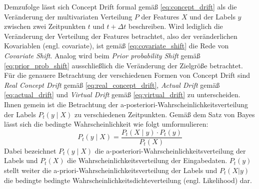 %
Demzufolge lässt sich Concept Drift formal gemäß \eqref{eq:concept_drift} als die Veränderung der multivariaten Verteilung $P$ der Features $X$ und der Labels $y$ zwischen zwei Zeitpunkten $t$ und $t + \Delta t$ beschreiben. 
Wird lediglich die Veränderung der Verteilung der Features betrachtet, also der veränderlichen Kovariablen (engl. covariate), ist gemäß \eqref{eq:covariate_shift} die Rede von \emph{Covariate Shift}. Analog wird beim \emph{Prior probability Shift} gemäß \eqref{eq:prior_prob_shift} ausschließlich die Veränderung der Zielgröße betrachtet. 
Für die genauere Betrachtung der verschiedenen Formen von Concept Drift sind \emph{Real Concept Drift} gemäß \eqref{eq:real_concept_drift}, \emph{Actual Drift} gemäß \eqref{eq:actual_drift} und \emph{Virtual Drift} gemäß \eqref{eq:virtual_drift} zu unterscheiden. Ihnen gemein ist die Betrachtung der a-posteriori-Wahrscheinlichkeitsverteilung der Labels $P_t(y \mid X)$ zu verschiedenen Zeitpunkten. Gemäß dem Satz von Bayes lässt sich die bedingte Wahrscheinlichkeit wie folgt umformulieren:
%
\begin{equation} \label{eq:bayes}
    P_t(y \mid X) = \frac{P_t(X \mid y) \cdot P_t(y)}{P_t(X)}
\end{equation}
%
Dabei bezeichnet $P_t(y \mid X)$ die a-posteriori-Wahrscheinlichkeitsverteilung der Labels und $P_t(X)$ die Wahrscheinlichkeitsverteilung der Eingabedaten. $P_t(y)$ stellt weiter die a-priori-Wahrscheinlichkeitsverteilung der Labels und $P_t(X | y)$ die bedingte bedingte Wahrscheinlichkeitsdichteverteilung (engl. Likelihood) dar.
%

